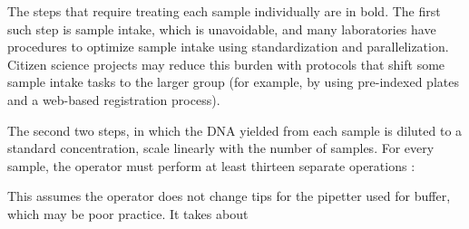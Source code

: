 \begin{refsection}
\noindent The steps that require treating each sample individually are in bold. The first such step is sample intake, which is unavoidable, and many laboratories have procedures to optimize sample intake using standardization and parallelization. Citizen science projects may reduce this burden with protocols that shift some sample intake tasks to the larger group (for example, by using pre-indexed plates and a web-based registration process). 

The second two steps, in which the DNA yielded from each sample is diluted to a standard concentration, scale linearly with the number of samples. For every sample, the operator must perform at least thirteen separate operations :



\noindent This assumes the operator does not change tips for the pipetter used for buffer, which may be poor practice. It takes about 


\printbibliography[heading=subbibliography]

\end{refsection}